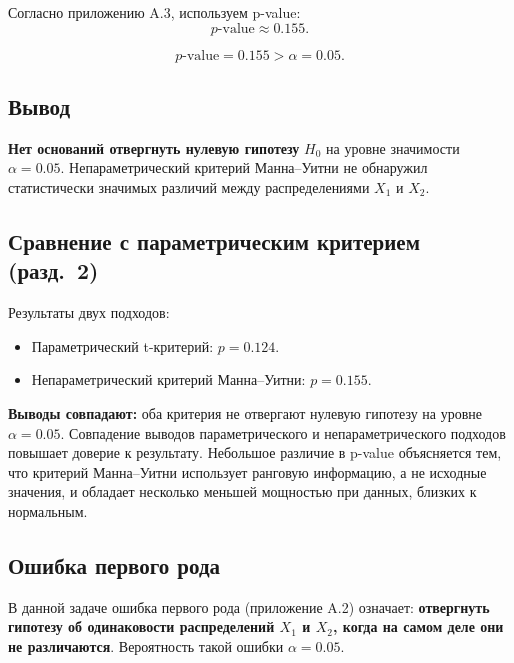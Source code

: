 Согласно приложению A.3, используем p-value:
\[
p\text{-value} \approx 0.155.
\]

\[
p\text{-value} = 0.155 > \alpha = 0.05.
\]

\subsection{Вывод}

\textbf{Нет оснований отвергнуть нулевую гипотезу} \(H_0\) на уровне значимости \(\alpha = 0.05\). Непараметрический критерий Манна–Уитни не обнаружил статистически значимых различий между распределениями \(X_1\) и \(X_2\).

\subsection{Сравнение с параметрическим критерием (разд.~2)}

Результаты двух подходов:
\begin{itemize}
    \item Параметрический t-критерий: \(p = 0.124\).
    \item Непараметрический критерий Манна–Уитни: \(p = 0.155\).
\end{itemize}

\textbf{Выводы совпадают:} оба критерия не отвергают нулевую гипотезу на уровне \(\alpha = 0.05\). Совпадение выводов параметрического и непараметрического подходов повышает доверие к результату. Небольшое различие в p-value объясняется тем, что критерий Манна–Уитни использует ранговую информацию, а не исходные значения, и обладает несколько меньшей мощностью при данных, близких к нормальным.

\subsection{Ошибка первого рода}

В данной задаче ошибка первого рода (приложение A.2) означает: \textbf{отвергнуть гипотезу об одинаковости распределений \(X_1\) и \(X_2\), когда на самом деле они не различаются}. Вероятность такой ошибки \(\alpha = 0.05\).
